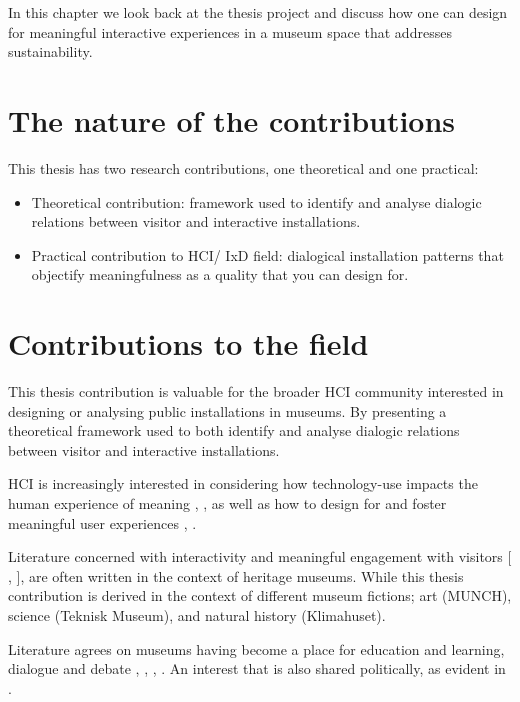 In this chapter we look back at the thesis project and discuss how one can design for meaningful interactive experiences in a museum space that addresses sustainability.

\section{The nature of the contributions}
This thesis has two research contributions, one theoretical and one practical:
\begin{itemize}
    \item Theoretical contribution: framework used to identify and analyse dialogic relations between visitor and interactive installations.
    \item Practical contribution to HCI/ IxD field: dialogical installation patterns that objectify meaningfulness as a quality that you can design for.
\end{itemize}


\section{Contributions to the field}

This thesis contribution is valuable for the broader HCI community interested in designing or analysing public installations in museums. By presenting a theoretical framework used to both identify and analyse dialogic relations between visitor and interactive installations. 

HCI is increasingly interested in considering how technology-use impacts the human experience of meaning \autocite{kaptelinin_technology_2018}, \autocite{light_design_2017}, as well as how to design for and foster meaningful user experiences \autocite{grosse-hering_slow_2013}, \autocite{Hassenzahl_Moments_2013}.


Literature concerned with interactivity and meaningful engagement with visitors [ \autocite{mccarthy_place}, \autocite{ciolfi_designing_2012}], are often written in the context of heritage museums. While this thesis contribution is derived in the context of different museum fictions; art (MUNCH), science (Teknisk Museum), and natural history (Klimahuset). 


Literature agrees on museums having become a place for education and learning, dialogue and debate \autocite{narrative_sitzia}, \autocite{hein_1998}, \autocite{hooper_1994}, \autocite{Roberts_1997}. An interest that is also shared politically, as evident in \autocite{melding23}. 




